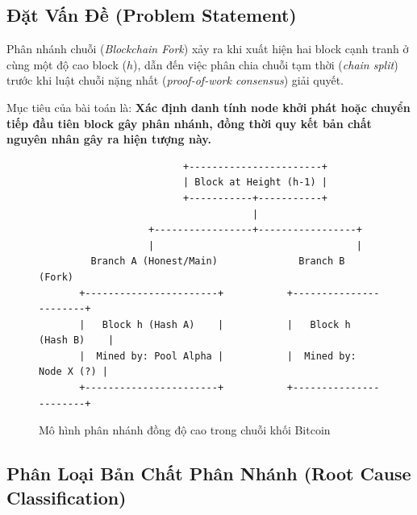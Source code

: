 \documentclass[11pt,a4paper]{article}
\begin{document}
\subsection{Đặt Vấn Đề (Problem Statement)}
Phân nhánh chuỗi (\textit{Blockchain Fork}) xảy ra khi xuất hiện hai block cạnh tranh ở cùng một độ cao block ($h$), dẫn đến việc phân chia chuỗi tạm thời (\textit{chain split}) trước khi luật chuỗi nặng nhất (\textit{proof-of-work consensus}) giải quyết.

Mục tiêu của bài toán là: \textbf{Xác định danh tính node khởi phát hoặc chuyển tiếp đầu tiên block gây phân nhánh, đồng thời quy kết bản chất nguyên nhân gây ra hiện tượng này.}

\begin{figure}[H]
\centering
\begin{verbatim}
                         +-----------------------+
                         | Block at Height (h-1) |
                         +-----------+-----------+
                                     |
                   +-----------------+-----------------+
                   |                                   |
         Branch A (Honest/Main)              Branch B (Fork)
       +-----------------------+           +-----------------------+
       |   Block h (Hash A)    |           |   Block h (Hash B)    |
       |  Mined by: Pool Alpha |           |  Mined by: Node X (?) |
       +-----------------------+           +-----------------------+
\end{verbatim}
\caption{Mô hình phân nhánh đồng độ cao trong chuỗi khối Bitcoin}
\label{fig:fork_model}
\end{figure}

\subsection{Phân Loại Bản Chất Phân Nhánh (Root Cause Classification)}
\end{document}
